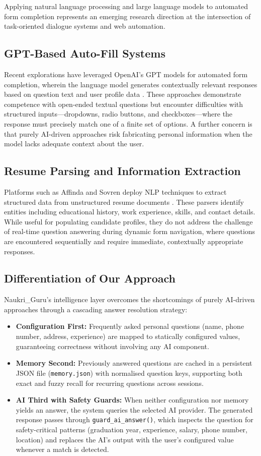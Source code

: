 \documentclass[12pt, a4paper, oneside]{report}
\begin{document}
Applying natural language processing and large language models to automated form completion represents an emerging research direction at the intersection of task-oriented dialogue systems and web automation.

\subsection{GPT-Based Auto-Fill Systems}
Recent explorations have leveraged OpenAI's GPT models for automated form completion, wherein the language model generates contextually relevant responses based on question text and user profile data \cite{ref8}. These approaches demonstrate competence with open-ended textual questions but encounter difficulties with structured inputs---dropdowns, radio buttons, and checkboxes---where the response must precisely match one of a finite set of options. A further concern is that purely AI-driven approaches risk fabricating personal information when the model lacks adequate context about the user.

\subsection{Resume Parsing and Information Extraction}
Platforms such as Affinda and Sovren deploy NLP techniques to extract structured data from unstructured resume documents \cite{ref9}. These parsers identify entities including educational history, work experience, skills, and contact details. While useful for populating candidate profiles, they do not address the challenge of real-time question answering during dynamic form navigation, where questions are encountered sequentially and require immediate, contextually appropriate responses.

\subsection{Differentiation of Our Approach}
Naukri\_Guru's intelligence layer overcomes the shortcomings of purely AI-driven approaches through a cascading answer resolution strategy:

\begin{itemize}
    \item \textbf{Configuration First:} Frequently asked personal questions (name, phone number, address, experience) are mapped to statically configured values, guaranteeing correctness without involving any AI component.
    \item \textbf{Memory Second:} Previously answered questions are cached in a persistent JSON file (\texttt{memory.json}) with normalised question keys, supporting both exact and fuzzy recall for recurring questions across sessions.
    \item \textbf{AI Third with Safety Guards:} When neither configuration nor memory yields an answer, the system queries the selected AI provider. The generated response passes through \texttt{guard\_ai\_answer()}, which inspects the question for safety-critical patterns (graduation year, experience, salary, phone number, location) and replaces the AI's output with the user's configured value whenever a match is detected.
\end{itemize}
\end{document}
